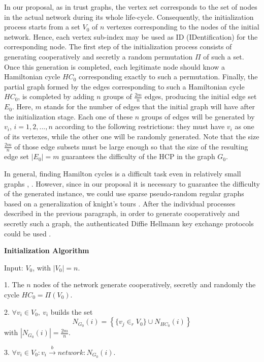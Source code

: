 \documentclass{article}
\begin{document}
In our proposal, as in trust graphs, the vertex set corresponds to the set of nodes in the actual network during its whole life-cycle. Consequently, the initialization process starts from a set $V_{0}$ of $n$
vertexes corresponding to the nodes of the initial network.
Hence, each vertex sub-index may be used as ID
(IDentification) for the corresponding node. The first step of the
initialization process consists of generating cooperatively and secretly
a random permutation $\Pi$ of such a set. Once this generation is
completed, each legitimate node should know a Hamiltonian cycle
$HC_{0}$ corresponding exactly to such a permutation. Finally, the
partial graph formed by the edges corresponding to such a
Hamiltonian cycle $HC_0$, is completed by adding $n$ groups of
$\frac{2m}{n}$ edges, producing the initial edge set $E_0$. Here, $m$ stands for the number of edges that the initial graph will have after the initialization stage. Each one of these $n$ groups of edges will be generated by $v_i$, $i=1,2,...,n$ according to the following restrictions: they must have $v_i$ as one of its vertexes,
while the other one will be randomly generated. Note
that the size $\frac{2m}{n}$ of those edge subsets must
be large enough so that the size of the resulting edge set
$\left|E_{0}\right| = m$ guarantees the difficulty of the HCP in
the graph $G_0$.

In general, finding Hamilton cycles is a difficult task even in relatively small graphs \cite{Van98}, \cite{Shi04}. However, since in our proposal it is necessary to guarantee the difficulty of the generated instance,  we could use sparse pseudo-random regular graphs based on a generalization of knight's tours \cite{KS02}. After the individual processes described in the previous paragraph, in order to generate cooperatively and secretly such a graph, the authenticated Diffie Hellmann key exchange protocols could be used \cite{DVW92}.  

{\bf Initialization Algorithm}

Input: $V_{0}$, with $\left|V_{0}\right| = n$.

1. The  $ n $ nodes of the network generate cooperatively, secretly and randomly the cycle $HC_{0}=\Pi\left(V_{0}\right)$.

2. $\forall v_i \in V_{0},\ v_i$ builds the set $$N_{G_{0}}(i) =\left\{   \{v_j \in_r V_{0}\} \cup N_{HC_0}(i)\right\}$$ with $\left|N_{G_{0}}(i)\right| = \frac{2m}{n}$.

3. $\forall v_i \in V_{0}: v_i \stackrel{b}{\rightarrow} network: N_{G_{0}}(i) $.
\end{document}
